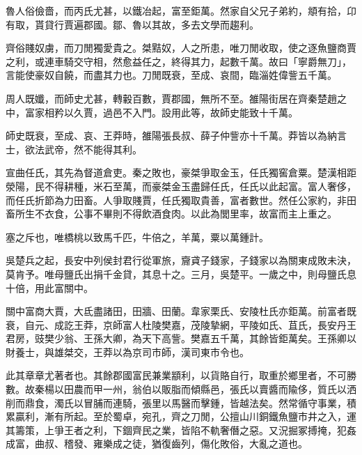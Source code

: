 \begin{pinyinscope}
魯人俗儉嗇，而丙氏尤甚，以鐵冶起，富至鉅萬。然家自父兄子弟約，頫有拾，卬有取，貰貸行賈遍郡國。鄒、魯以其故，多去文學而趨利。

齊俗賤奴虜，而刀閒獨愛貴之。桀黠奴，人之所患，唯刀閒收取，使之逐魚鹽商賈之利，或連車騎交守相，然愈益任之，終得其力，起數千萬。故曰「寧爵無刀」，言能使豪奴自饒，而盡其力也。刀閒既衰，至成、哀間，臨淄姓偉訾五千萬。

周人既孅，而師史尤甚，轉轂百數，賈郡國，無所不至。雒陽街居在齊秦楚趙之中，富家相矜以久賈，過邑不入門。設用此等，故師史能致十千萬。

師史既衰，至成、哀、王莽時，雒陽張長叔、薛子仲訾亦十千萬。莽皆以為納言士，欲法武帝，然不能得其利。

宣曲任氏，其先為督道倉吏。秦之敗也，豪桀爭取金玉，任氏獨窖倉粟。楚漢相距滎陽，民不得耕種，米石至萬，而豪桀金玉盡歸任氏，任氏以此起富。富人奢侈，而任氏折節為力田畜。人爭取賤賈，任氏獨取貴善，富者數世。然任公家約，非田畜所生不衣食，公事不畢則不得飲酒食肉。以此為閭里率，故富而主上重之。

塞之斥也，唯橋桃以致馬千匹，牛倍之，羊萬，粟以萬鍾計。

吳楚兵之起，長安中列侯封君行從軍旅，齎貣子錢家，子錢家以為關東成敗未決，莫肯予。唯母鹽氏出捐千金貸，其息十之。三月，吳楚平。一歲之中，則母鹽氏息十倍，用此富關中。

關中富商大賈，大氐盡諸田，田牆、田蘭。韋家栗氏、安陵杜氏亦鉅萬。前富者既衰，自元、成訖王莽，京師富人杜陵樊嘉，茂陵摯網，平陵如氏、苴氏，長安丹王君房，豉樊少翁、王孫大卿，為天下高訾。樊嘉五千萬，其餘皆鉅萬矣。王孫卿以財養士，與雄桀交，王莽以為京司市師，漢司東市令也。

此其章章尤著者也。其餘郡國富民兼業顓利，以貨賂自行，取重於鄉里者，不可勝數。故秦楊以田農而甲一州，翁伯以販脂而傾縣邑，張氏以賣醬而隃侈，質氏以洒削而鼎食，濁氏以冒脯而連騎，張里以馬醫而擊鍾，皆越法矣。然常循守事業，積累贏利，漸有所起。至於蜀卓，宛孔，齊之刀閒，公擅山川銅鐵魚鹽市井之入，運其籌策，上爭王者之利，下錮齊民之業，皆陷不軌奢僭之惡。又況掘冢搏掩，犯姦成富，曲叔、稽發、雍樂成之徒，猶復齒列，傷化敗俗，大亂之道也。


\end{pinyinscope}